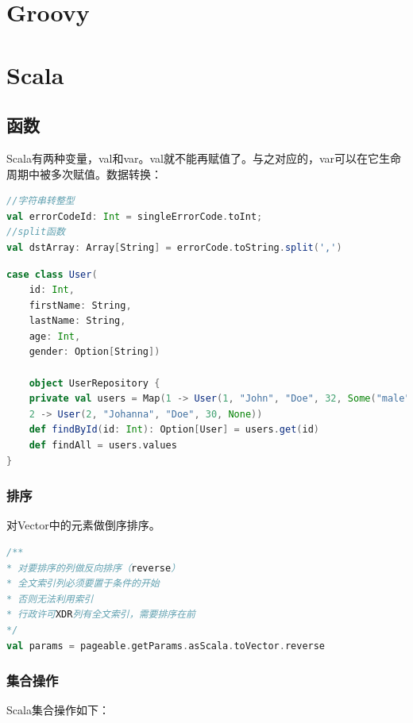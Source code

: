 \documentclass[letter]{book}
\begin{document}
\newpage

\chapter{Groovy}

\chapter{Scala}

\section{函数}

Scala有两种变量，val和var。val就不能再赋值了。与之对应的，var可以在它生命周期中被多次赋值。数据转换：

\begin{lstlisting}[language=Scala]
//字符串转整型
val errorCodeId: Int = singleErrorCode.toInt;
//split函数
val dstArray: Array[String] = errorCode.toString.split(',')
\end{lstlisting}


\begin{lstlisting}[language=Scala]
case class User(  
	id: Int,  
	firstName: String,  
	lastName: String,  
	age: Int,  
	gender: Option[String])  
	
	object UserRepository {  
	private val users = Map(1 -> User(1, "John", "Doe", 32, Some("male")),  
	2 -> User(2, "Johanna", "Doe", 30, None))  
	def findById(id: Int): Option[User] = users.get(id)  
	def findAll = users.values  
}  
\end{lstlisting}

\subsection{排序}

对Vector中的元素做倒序排序。

\begin{lstlisting}[language=Scala]
/**
* 对要排序的列做反向排序（reverse）
* 全文索引列必须要置于条件的开始
* 否则无法利用索引
* 行政许可XDR列有全文索引，需要排序在前
*/
val params = pageable.getParams.asScala.toVector.reverse  
\end{lstlisting}

\subsection{集合操作}

Scala集合操作如下：
\end{document}
